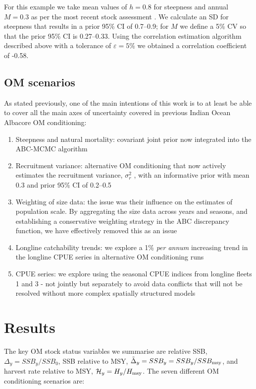 \documentclass[12pt,a4paper,twoside,times,sky,standard]{csiroreport2017}
\newcommand{\veps}{\varepsilon}
\newcommand{\sigr}{\sigma^2_r}
\begin{document}
For this example we take mean values of $h = 0.8$ for steepness and annual $M = 0.3$ as per the most recent stock assessment \cite{albsa}. We calculate an SD for steepness that results in a prior 95\% CI of 0.7--0.9; for $M$ we define a 5\% CV so that the prior 95\% CI is 0.27--0.33. Using the correlation estimation algorithm described above with a tolerance of $\veps = 5\%$ we obtained a correlation coefficient of -0.58.

\subsection{OM scenarios}

As stated previously, one of the main intentions of this work is to at least be able to cover all the main axes of uncertainty covered in previous Indian Ocean Albacore OM conditioning:

\begin{enumerate}
    \item Steepness and natural mortality: covariant joint prior now integrated into the ABC-MCMC algorithm
    \item Recruitment variance: alternative OM conditioning that now actively estimates the recruitment variance, $\sigr$ , with an informative prior with mean 0.3 and prior 95\% CI of 0.2--0.5
    \item Weighting of size data: the issue was their influence on the estimates of population scale. By aggregating the size data across years and seasons, and establishing a conservative weighting strategy in the ABC discrepancy function, we have effectively removed this as an issue
    \item Longline catchability trends: we explore a 1\% \textit{per annum} increasing trend in the longline CPUE series in alternative OM conditioning runs
    \item CPUE series: we explore using the seasonal CPUE indices from longline fleets 1 and 3 - not jointly but separately to avoid data conflicts that will not be resolved without more complex spatially structured models
\end{enumerate}

\section{Results}

The key OM stock status variables we summarise are relative SSB, $\Delta_y=SSB_y/SSB_0$, SSB relative to MSY, $\tilde{\Delta}_y=SSB_y=SSB_y/SSB_{\rm msy}$, and harvest rate relative to MSY, $\mathcal{H}_y=H_y/H_{\rm msy}$. The seven different OM conditioning scenarios are:
\end{document}
